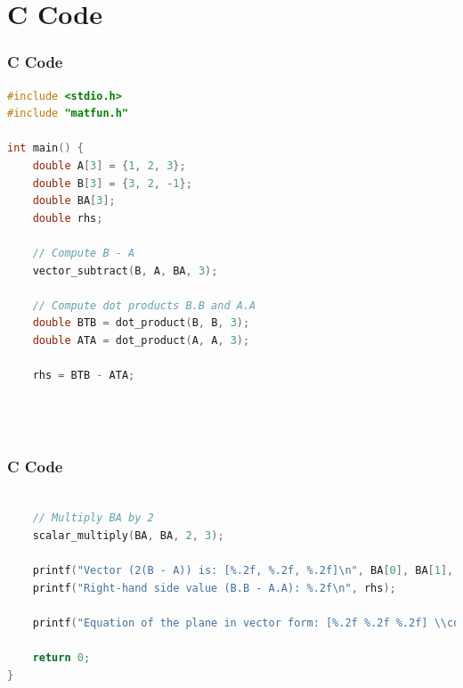 \documentclass{beamer}
\numberwithin{equation}{section}
\begin{document}
\section{ C Code}
\begin{frame}[fragile]
\frametitle{C Code }
\begin{lstlisting}[language=C]
#include <stdio.h>
#include "matfun.h"

int main() {
    double A[3] = {1, 2, 3};
    double B[3] = {3, 2, -1};
    double BA[3];
    double rhs;

    // Compute B - A
    vector_subtract(B, A, BA, 3);

    // Compute dot products B.B and A.A
    double BTB = dot_product(B, B, 3);
    double ATA = dot_product(A, A, 3);

    rhs = BTB - ATA;


    
\end{lstlisting}
\end{frame}
\begin{frame}[fragile]
\frametitle{C Code }
\begin{lstlisting}[language=C]

    // Multiply BA by 2
    scalar_multiply(BA, BA, 2, 3);

    printf("Vector (2(B - A)) is: [%.2f, %.2f, %.2f]\n", BA[0], BA[1], BA[2]);
    printf("Right-hand side value (B.B - A.A): %.2f\n", rhs);

    printf("Equation of the plane in vector form: [%.2f %.2f %.2f] \\cdot X = %.2f\n", BA[0], BA[1], BA[2], rhs/2);

    return 0;
}


    
\end{lstlisting}
\end{frame}
\end{document}
